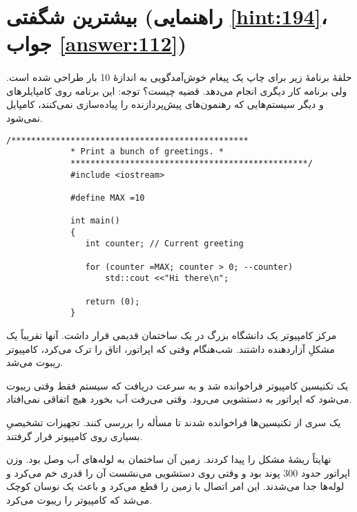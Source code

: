 \section[بیشترین شگفتی]{بیشترین شگفتی \protect{} (راهنمایی \ref{hint:194}، جواب \ref{answer:112})}
\paragraph{}\label{prog:25}
حلقهٔ برنامهٔ زیر برای چاپ یک پیغام خوش‌آمدگویی به اندازهٔ 10 بار طراحی شده است. ولی برنامه کار دیگری انجام می‌دهد. قضیه چیست؟
توجه: این برنامه روی کامپایلرهای  و دیگر سیستم‌هایی که رهنمون‌های پیش‌پردازنده را پیاده‌سازی نمی‌کنند، کامپایل نمی‌شود.

\begin{LTR}
        \begin{lstlisting}[style=C++Style]
             /************************************************
             * Print a bunch of greetings. *
             ************************************************/
             #include <iostream>

             #define MAX =10

             int main()
             {
             	int counter; // Current greeting

             	for (counter =MAX; counter > 0; --counter)
             		std::cout <<"Hi there\n";

             	return (0);
             }
        \end{lstlisting}
\end{LTR}

\begin{tcolorbox}
    مرکز کامپیوتر یک دانشگاه بزرگ در یک ساختمان قدیمی قرار داشت. آنها تقریباً یک مشکلِ آزاردهنده داشتند. شب‌هنگام وقتی که اپراتور، اتاق را ترک می‌کرد، کامپیوتر ریبوت می‌شد.

    یک تکنیسین کامپیوتر فراخوانده شد و به سرعت دریافت که سیستم فقط وقتی ریبوت می‌شود که اپراتور به دستشویی می‌رود. وقتی می‌رفت آب بخورد هیچ اتفاقی نمی‌افتاد.

    یک سری از تکنیسین‌ها فراخوانده شدند تا مسأله را بررسی کنند. تجهیزات تشخیصیِ بسیاری روی کامپیوتر قرار گرفتند.

    نهایتاً ریشهٔ مشکل را پیدا کردند. زمین آن ساختمان به لوله‌های آب وصل بود. وزن اپراتور حدود 300 پوند بود و وقتی روی دستشویی می‌نشست آن را قدری خم می‌کرد و لوله‌ها جدا می‌شدند. این امر اتصال با زمین را قطع می‌کرد و باعث یک نوسان کوچک می‌شد که کامپیوتر را ریبوت می‌کرد.
\end{tcolorbox}